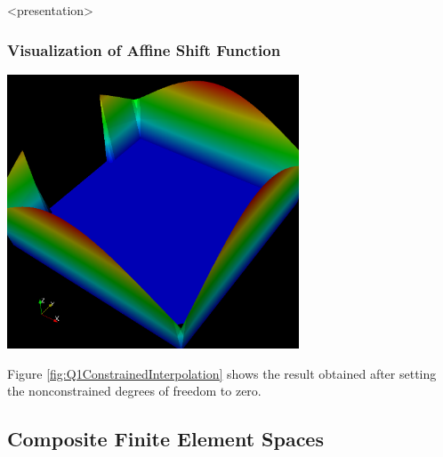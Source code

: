 \begin{frame}<presentation>
\frametitle<presentation>{Visualization of Affine Shift Function}
\begin{center}
\includegraphics[width=0.65\textwidth]{./EPS/q1constrainedinterpolate}
\end{center}
\end{frame}

Figure \ref{fig:Q1ConstrainedInterpolation} shows the result obtained
after setting the nonconstrained degrees of freedom to zero.



\subsection{Composite Finite Element Spaces}

